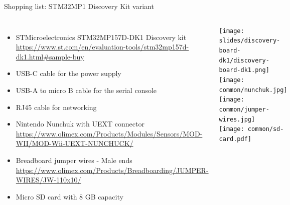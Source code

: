 \begin{frame}[fragile]{Shopping list: STM32MP1 Discovery Kit variant}
  \begin{columns}
    \begin{itemize}
    \item STMicroelectronics STM32MP157D-DK1 Discovery kit
      {\fontsize{6}{6}\selectfont
        \url{https://www.st.com/en/evaluation-tools/stm32mp157d-dk1.html#sample-buy}
      }
    \item USB-C cable for the power supply
    \item USB-A to micro B cable for the serial console
    \item RJ45 cable for networking
    \item Nintendo Nunchuk with UEXT connector
      {\fontsize{6}{6}\selectfont
        \url{https://www.olimex.com/Products/Modules/Sensors/MOD-WII/MOD-Wii-UEXT-NUNCHUCK/}
      }
    \item Breadboard jumper wires - Male ends
      {\fontsize{6}{6}\selectfont
        \url{https://www.olimex.com/Products/Breadboarding/JUMPER-WIRES/JW-110x10/}
      }
    \item Micro SD card with 8 GB capacity
    \end{itemize}
    \begin{center}
      \texttt{[image: slides/discovery-board-dk1/discovery-board-dk1.png]}\\
      \texttt{[image: common/nunchuk.jpg]} \\
      \texttt{[image: common/jumper-wires.jpg]} \\
      \texttt{[image: common/sd-card.pdf]}
    \end{center}
  \end{columns}
\end{frame}

